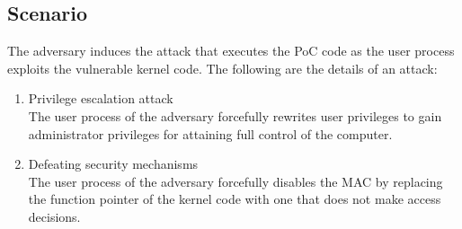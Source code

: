 \subsection{Scenario} \label{subsection:attack_scenario}
The adversary induces the attack that executes the PoC code as the user
process exploits the vulnerable kernel code. 
%
The following are the details of an attack:
%

\begin{enumerate}%
  \item Privilege escalation attack\\
    The user process of the adversary forcefully rewrites user privileges to
    gain administrator privileges for attaining full control of the computer.
  \item Defeating security mechanisms\\
    The user process of the adversary forcefully disables the MAC by replacing the
    function pointer of the kernel code with one that does not make access
    decisions.

  
\end{enumerate}





